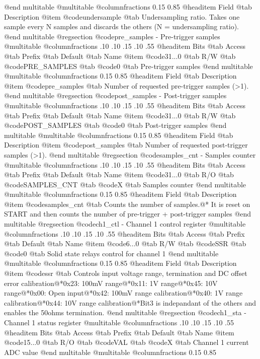 @end multitable
@multitable @columnfractions 0.15 0.85
@headitem Field @tab Description
@item @code{undersample} @tab Undersampling ratio. Takes one sample every N samples and discards the others (N = undersampling ratio).
@end multitable
@regsection @code{pre_samples} - Pre-trigger samples
@multitable @columnfractions .10 .10 .15 .10 .55
@headitem Bits @tab Access @tab Prefix @tab Default @tab Name
@item @code{31...0}
@tab R/W @tab
@code{PRE_SAMPLES}
@tab @code{0} @tab 
Pre-trigger samples
@end multitable
@multitable @columnfractions 0.15 0.85
@headitem Field @tab Description
@item @code{pre_samples} @tab Number of requested pre-trigger samples (>1).
@end multitable
@regsection @code{post_samples} - Post-trigger samples
@multitable @columnfractions .10 .10 .15 .10 .55
@headitem Bits @tab Access @tab Prefix @tab Default @tab Name
@item @code{31...0}
@tab R/W @tab
@code{POST_SAMPLES}
@tab @code{0} @tab 
Post-trigger samples
@end multitable
@multitable @columnfractions 0.15 0.85
@headitem Field @tab Description
@item @code{post_samples} @tab Number of requested post-trigger samples (>1).
@end multitable
@regsection @code{samples_cnt} - Samples counter
@multitable @columnfractions .10 .10 .15 .10 .55
@headitem Bits @tab Access @tab Prefix @tab Default @tab Name
@item @code{31...0}
@tab R/O @tab
@code{SAMPLES_CNT}
@tab @code{X} @tab 
Samples counter
@end multitable
@multitable @columnfractions 0.15 0.85
@headitem Field @tab Description
@item @code{samples_cnt} @tab Counts the number of samples.@* It is reset on START and then counts the number of pre-trigger + post-trigger samples
@end multitable
@regsection @code{ch1_ctl} - Channel 1 control register
@multitable @columnfractions .10 .10 .15 .10 .55
@headitem Bits @tab Access @tab Prefix @tab Default @tab Name
@item @code{6...0}
@tab R/W @tab
@code{SSR}
@tab @code{0} @tab 
Solid state relays control for channel 1
@end multitable
@multitable @columnfractions 0.15 0.85
@headitem Field @tab Description
@item @code{ssr} @tab Controls input voltage range, termination and DC offset error calibration@*0x23: 100mV range@*0x11: 1V range@*0x45: 10V range@*0x00: Open input@*0x42: 100mV range calibration@*0x40: 1V range calibration@*0x44: 10V range calibration@*Bit3 is indepandant of the others and enables the 50ohms termination.
@end multitable
@regsection @code{ch1_sta} - Channel 1 status register
@multitable @columnfractions .10 .10 .15 .10 .55
@headitem Bits @tab Access @tab Prefix @tab Default @tab Name
@item @code{15...0}
@tab R/O @tab
@code{VAL}
@tab @code{X} @tab 
Channel 1 current ADC value
@end multitable
@multitable @columnfractions 0.15 0.85
